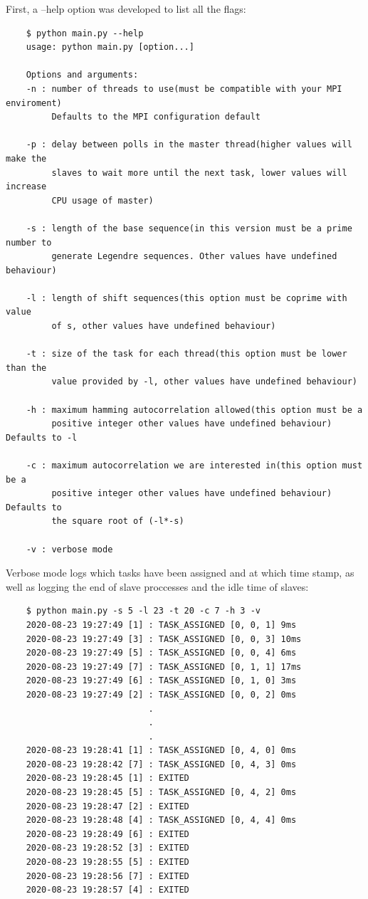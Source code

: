   First, a --help option was developed to list all the flags:
  \begin{lstlisting}
    $ python main.py --help
    usage: python main.py [option...]

    Options and arguments:
    -n : number of threads to use(must be compatible with your MPI enviroment)
         Defaults to the MPI configuration default

    -p : delay between polls in the master thread(higher values will make the
         slaves to wait more until the next task, lower values will increase
         CPU usage of master)

    -s : length of the base sequence(in this version must be a prime number to
         generate Legendre sequences. Other values have undefined behaviour)

    -l : length of shift sequences(this option must be coprime with value
         of s, other values have undefined behaviour)

    -t : size of the task for each thread(this option must be lower than the
         value provided by -l, other values have undefined behaviour)

    -h : maximum hamming autocorrelation allowed(this option must be a
         positive integer other values have undefined behaviour) Defaults to -l

    -c : maximum autocorrelation we are interested in(this option must be a
         positive integer other values have undefined behaviour) Defaults to
         the square root of (-l*-s)

    -v : verbose mode
  \end{lstlisting}

  Verbose mode logs which tasks have been assigned and at which time stamp, as
  well as logging the end of slave proccesses and the idle time of slaves:

  \begin{lstlisting}
    $ python main.py -s 5 -l 23 -t 20 -c 7 -h 3 -v
    2020-08-23 19:27:49 [1] : TASK_ASSIGNED [0, 0, 1] 9ms
    2020-08-23 19:27:49 [3] : TASK_ASSIGNED [0, 0, 3] 10ms
    2020-08-23 19:27:49 [5] : TASK_ASSIGNED [0, 0, 4] 6ms
    2020-08-23 19:27:49 [7] : TASK_ASSIGNED [0, 1, 1] 17ms
    2020-08-23 19:27:49 [6] : TASK_ASSIGNED [0, 1, 0] 3ms
    2020-08-23 19:27:49 [2] : TASK_ASSIGNED [0, 0, 2] 0ms
                            .
                            .
                            .
    2020-08-23 19:28:41 [1] : TASK_ASSIGNED [0, 4, 0] 0ms
    2020-08-23 19:28:42 [7] : TASK_ASSIGNED [0, 4, 3] 0ms
    2020-08-23 19:28:45 [1] : EXITED
    2020-08-23 19:28:45 [5] : TASK_ASSIGNED [0, 4, 2] 0ms
    2020-08-23 19:28:47 [2] : EXITED
    2020-08-23 19:28:48 [4] : TASK_ASSIGNED [0, 4, 4] 0ms
    2020-08-23 19:28:49 [6] : EXITED
    2020-08-23 19:28:52 [3] : EXITED
    2020-08-23 19:28:55 [5] : EXITED
    2020-08-23 19:28:56 [7] : EXITED
    2020-08-23 19:28:57 [4] : EXITED

  \end{lstlisting}

